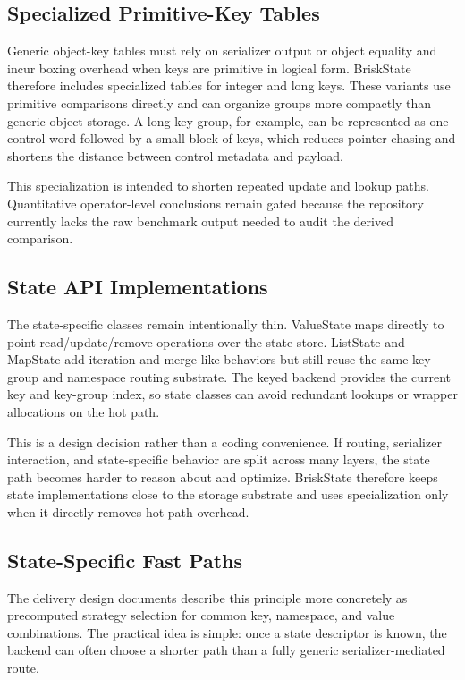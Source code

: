\documentclass[journal]{IEEEtran}
\newcommand{\briskstate}{BriskState\xspace}
\newcommand{\system}{\briskstate}
\begin{document}
\subsection{Specialized Primitive-Key Tables}

Generic object-key tables must rely on serializer output or object equality and incur boxing overhead when keys are primitive in logical form. \system therefore includes specialized tables for integer and long keys. These variants use primitive comparisons directly and can organize groups more compactly than generic object storage. A long-key group, for example, can be represented as one control word followed by a small block of keys, which reduces pointer chasing and shortens the distance between control metadata and payload.

This specialization is intended to shorten repeated update and lookup paths. Quantitative operator-level conclusions remain gated because the repository currently lacks the raw benchmark output needed to audit the derived comparison.

\subsection{State API Implementations}

The state-specific classes remain intentionally thin. ValueState maps directly to point read/update/remove operations over the state store. ListState and MapState add iteration and merge-like behaviors but still reuse the same key-group and namespace routing substrate. The keyed backend provides the current key and key-group index, so state classes can avoid redundant lookups or wrapper allocations on the hot path.

This is a design decision rather than a coding convenience. If routing, serializer interaction, and state-specific behavior are split across many layers, the state path becomes harder to reason about and optimize. \system therefore keeps state implementations close to the storage substrate and uses specialization only when it directly removes hot-path overhead.

\subsection{State-Specific Fast Paths}

The delivery design documents describe this principle more concretely as precomputed strategy selection for common key, namespace, and value combinations. The practical idea is simple: once a state descriptor is known, the backend can often choose a shorter path than a fully generic serializer-mediated route.
\end{document}
